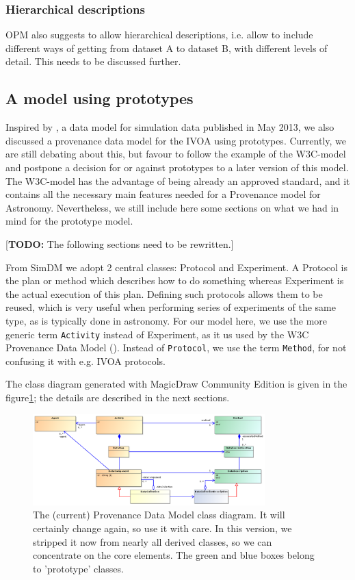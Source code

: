 \documentclass[11pt,a4paper]{ivoa}
\newcommand{\TODO}[1]{\noindent \textcolor{todocolor}{[\textbf{TODO:} #1]}}
\begin{document}
\subsubsection{Hierarchical descriptions}
OPM also suggests to allow hierarchical descriptions, i.e. allow to include different ways of getting from dataset A to dataset B, with different levels of detail. 
This needs to be discussed further. 


\subsection{A model using prototypes}
Inspired by \cite{std:SimDM}, a data model for simulation data published in May 2013, we also discussed a provenance data model for the IVOA using prototypes. 
Currently, we are still debating about this, but favour to follow the example of the W3C-model and postpone a decision for or against prototypes to a later version of this model. 
The W3C-model has the advantage of being already an approved standard, and it contains all the necessary main features needed for a Provenance model for Astronomy. Nevertheless, we still include here some sections on what we had in mind for the prototype model. 

\TODO{The following sections need to be rewritten.}

From SimDM we adopt 2 central classes: Protocol and Experiment.  A Protocol is the plan or method
which describes how to do something whereas Experiment is the actual execution of
this plan. Defining such protocols allows them to be reused, which is very useful when performing series of experiments of the same type, as is typically done in astronomy. For our model here, we use the more generic term
\texttt{Activity} instead of Experiment, as it us used by the W3C Provenance Data Model (\cite{std:W3CProvDM}). Instead of \texttt{Protocol}, we use the term \texttt{Method}, 
for not confusing it with e.g. IVOA protocols.

The class diagram generated with MagicDraw Community Edition is given in the figure\ref{fig:classes-prototypes}; the details are described in the next sections.

\begin{figure}
\centering
\includegraphics[width=0.8\textwidth]{ProvDM-classdiagram-prototypes.png}
\caption{The (current) Provenance Data Model
class diagram. It will certainly change again, so use it with care. In this version, we stripped it now from nearly all derived classes, so we can concentrate on the core elements. The green and blue boxes belong to 'prototype' classes.}
\label{fig:classes-prototypes}
\end{figure}
\end{document}
